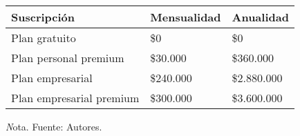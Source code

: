 \begin{adjustbox}{
            center,
            caption=[{Precios de suscripción.}]{Precios de suscripción mensual y anual },
            label={PrecioPeriodos},
            nofloat=table, vspace={20px}}
            {
            \begin{threeparttable}
                \begin{tabular}{|p{7cm}|p{4cm}|p{4cm}|}
                    \hline
                    \rowcolor[HTML]{D9EAD3}
                    Suscripción & Mensualidad & Anualidad \\ \hline
                    Plan gratuito & \$0 & \$0 \\ \hline
                    Plan personal premium & \$30.000 & \$360.000 \\ \hline
                    Plan empresarial & \$240.000 & \$2.880.000 \\ \hline
                    Plan empresarial premium & \$300.000 & \$3.600.000 \\ \hline
                \end{tabular}%
                \begin{tablenotes}
                    \vspace{2mm}
                    \textit Nota. Fuente: Autores.
                \end{tablenotes}
            \end{threeparttable}
    }
\end{adjustbox}
